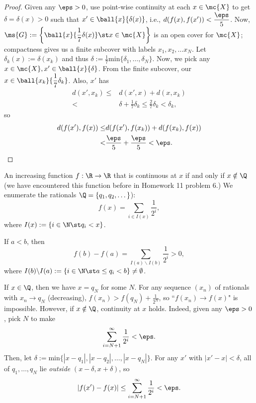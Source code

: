 \begin{proof}
	Given any \(\eps>0\), use point-wise continuity at each \(x\in\mc{X}\) to get \(\delta=\delta(x)>0\) such that \(x'\in\ball{x}{\delta(x)}\), i.e., \(d(f(x),f(x'))<\displaystyle\frac{\eps}{5}\). Now, \(\ms{G}:=\left\{\displaystyle\ball{x}{\frac{1}{7}\delta(x)}\st x\in\mc{X}\right\}\) is an open cover for \(\mc{X}\); compactness gives us a finite subcover with labels \(x_1,x_2,\dots x_N\). Let \(\delta_k(x):=\delta(x_k)\) and thus \(\delta:=\displaystyle\frac{1}{7}\text{min}\{\delta_1,\dots,\delta_N\}\). Now, we pick any \(x\in\mc{X},x'\in\ball{x}{\delta}\). From the finite subcover, our \(x\in\ball{x_k}{\displaystyle\frac{1}{7}\delta_k}\). Also, \(x'\) has 
	\begin{align*}
		d(x',x_k)\leq& d(x',x)+d(x,x_k)\\
					<& \delta+\frac{1}{7}\delta_k\leq\frac{2}{7}\delta_k<\delta_k,
	\end{align*}
	so 
	\begin{align*}
		d(f(x'),f(x))\leq& d(f(x'),f(x_k))+d(f(x_k),f(x))\\
						<& \frac{\eps}{5}+\frac{\eps}{5}<\eps.
	\end{align*}
\end{proof}

\begin{example}
	An increasing function \(f:\R\to\R\) that is continuous at \(x\) if and only if \(x\notin\Q\) (we have encountered this function before in Homework 11 problem 6.) We enumerate the rationals \(\Q=\{q_1,q_2,\dots\}\)):
	\begin{equation*}
		f(x)=\sum_{i\in I(x)} \frac{1}{2^i},
	\end{equation*}
	where \(I(x):=\{i\in\N\st q_i<x\}\).
	\begin{note}
		If \(a<b\), then 
		\begin{equation*}
			f(b)-f(a)=\sum_{I(a)\backslash I(b)} \frac{1}{2^i}>0,
		\end{equation*}
		where \(I(b)\backslash I(a):=\{i\in\N\st a\leq q_i<b\}\neq\emptyset\).
	\end{note}
	If \(x\in\Q\), then we have \(x=q_N\) for some \(N\). For any sequence \((x_n)\) of rationals with \(x_n\to q_N\) (decreasing), \(f(x_n)>f(q_N)+\displaystyle\frac{1}{2^N}\), so ``\(f(x_n)\to f(x)\)" is impossible. However, if \(x\notin\Q\), continuity at \(x\) holds. Indeed, given any \(\eps>0\), pick \(N\) to make
	\begin{equation*}
		\sum_{i=N+1}^{\infty}\frac{1}{2^i}<\eps.
	\end{equation*}
	Then, let \(\delta:=\text{min}\{|x-q_1|,|x-q_2|,\dots,|x-q_N|\}\). For any \(x'\) with \(|x'-x|<\delta\), all of \(q_1,\dots,q_N\) lie \emph{outside} \((x-\delta,x+\delta)\), so 
	\begin{equation*}
		|f(x')-f(x)|\leq \sum_{i=N+1}^{\infty}\frac{1}{2^i}<\eps.
	\end{equation*}
\end{example}


